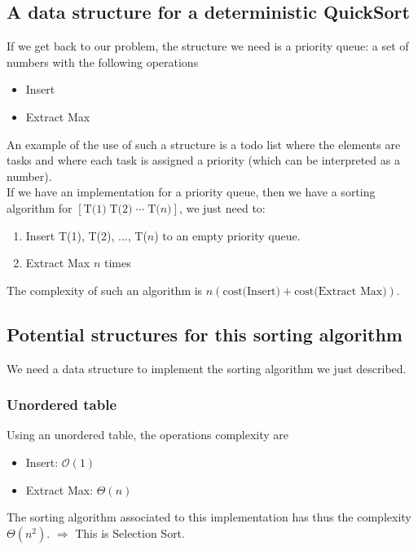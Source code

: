 \subsection{A data structure for a deterministic QuickSort}

If we get back to our problem, the structure we need is a priority queue: a set of numbers with the following operations
\begin{itemize}
\item Insert
\item Extract Max
\end{itemize}

An example of the use of such a structure is a todo list where the elements are tasks and where each task is assigned a priority (which can be interpreted as a number).\\

If we have an implementation for a priority queue, then we have a sorting algorithm for $\left[ \text{T(1)} \; \text{T(2)} \; \cdots \; \text{T(}n\text{)} \right]$, we just need to:
\begin{enumerate} 
\item Insert T(1), T(2), ..., T($n$) to an empty priority queue.
\item Extract Max $n$ times
\end{enumerate}
The complexity of such an algorithm is $n \left( \text{cost(Insert)} + \text{cost(Extract Max)} \right)$.

\subsection{Potential structures for this sorting algorithm}

We need a data structure to implement the sorting algorithm we just described. 

\subsubsection{Unordered table} 
Using an unordered table, the operations complexity are \begin{itemize}
\item Insert: $\mathcal{O}(1)$
\item Extract Max: $\Theta (n)$
\end{itemize}
The sorting algorithm associated to this implementation has thus the complexity $\Theta (n^2)$. \newline
$\Rightarrow$ This is Selection Sort.

